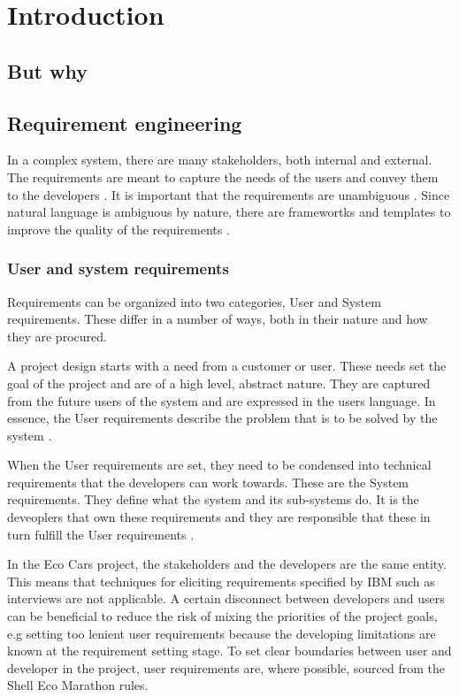 \chapter{Introduction}
\section{But why}
\section{Requirement engineering}
In a complex system, there are many stakeholders, both internal and external.
The requirements are meant to capture the needs of the users and convey them to
the developers \cite{ibm_req}. It is important that the requirements are
unambiguous \cite{ibm_req, rupp2014}. Since natural language is ambiguous by
nature, there are framewortks and templates to improve the quality of the
requirements \cite{rupp2014}. 

\subsection{User and system requirements}
Requirements can be organized into two categories, User and System requirements.
These differ in a number of ways, both in their nature and how they are
procured.

A project design starts with a need from a customer or user. These needs set the
goal of the project and are of a high level, abstract nature. They are captured
from the future users of the system and are expressed in the users language. In
essence, the User requirements describe the problem that is to be solved by the
system \cite{ibm_req}. 

When the User requirements are set, they need to be condensed into technical
requirements that the developers can work towards. These are the System
requirements. They define what the system and its sub-systems do. It is the
deveoplers that own these requirements and they are responsible that these in
turn fulfill the User requirements \cite{ibm_req}.

In the Eco Cars project, the stakeholders and the developers are the same
entity. This means that techniques for eliciting requirements specified by IBM
\cite{ibm_req} such as interviews are not applicable. A certain disconnect
between developers and users can be beneficial to reduce the risk of mixing the
priorities of the project goals, e.g setting too lenient user requirements
because the developing limitations are known at the requirement setting stage.
To set clear boundaries between user and developer in the project, user
requirements are, where possible, sourced from the Shell Eco Marathon rules.

